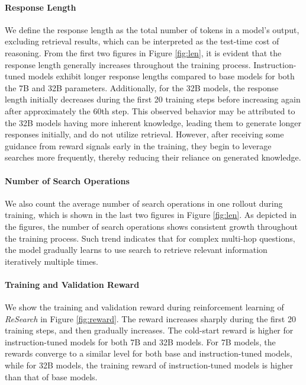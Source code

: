 \documentclass{article}
\begin{document}
\paragraph{Response Length}

We define the response length as the total number of tokens in a model's output, excluding retrieval results, which can be interpreted as the test-time cost of reasoning. 
From the first two figures in Figure \ref{fig:len}, it is evident that the response length generally increases throughout the training process. Instruction-tuned models exhibit longer response lengths compared to base models for both the 7B and 32B parameters. 
Additionally, for the 32B models, the response length initially decreases during the first 20 training steps before increasing again after approximately the 60th step. This observed behavior may be attributed to the 32B models having more inherent knowledge, leading them to generate longer responses initially, and do not utilize retrieval.
However, after receiving some guidance from reward signals early in the training, they begin to leverage searches more frequently, thereby reducing their reliance on generated knowledge.

\paragraph{Number of Search Operations}

We also count the average number of search operations in one rollout during training, which is shown in the last two figures in Figure \ref{fig:len}.
As depicted in the figures, the number of search operations shows consistent growth throughout the training process. Such trend indicates that for complex multi-hop questions, the model gradually learns to use search to retrieve relevant information iteratively multiple times.

\paragraph{Training and Validation Reward}

We show the training and validation reward during reinforcement learning of \textit{ReSearch} in Figure \ref{fig:reward}. The reward increases sharply during the first 20 training steps, and then gradually increases. The cold-start reward is higher for instruction-tuned models for both 7B and 32B models. For 7B models, the rewards converge to a similar level for both base and instruction-tuned models, while for 32B models, the training reward of instruction-tuned models is higher than that of base models.
\end{document}
